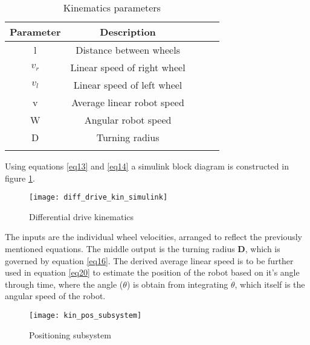 \begin{table}[h]
\centering
\begin{tabular}{cccll}
\hline
Parameter                   & Description                               &  &  \\ \hline
\multicolumn{1}{|c|}{l}     & \multicolumn{1}{c|}{Distance between wheels}       &  &  \\ \cline{1-2}
\multicolumn{1}{|c|}{$v_r$} & \multicolumn{1}{c|}{Linear speed of right wheel}  &  &  \\ \cline{1-2}
\multicolumn{1}{|c|}{$v_l$} & \multicolumn{1}{c|}{Linear speed of left wheel}  &  &  \\ \cline{1-2}
\multicolumn{1}{|c|}{v}     & \multicolumn{1}{c|}{Average linear robot speed}  &  &  \\ \cline{1-2}
\multicolumn{1}{|c|}{W}     & \multicolumn{1}{c|}{Angular robot speed}        &  &  \\ \cline{1-2}
\multicolumn{1}{|c|}{D}     & \multicolumn{1}{c|}{Turning radius}         &  &  \\ \cline{1-2}
\multicolumn{1}{l}{}        & \multicolumn{1}{l}{}                      &  &  \\ \hline
\end{tabular}
\caption{Kinematics parameters}
\label{kin_para}
\end{table}

Using equations \ref{eq13} and \ref{eq14} a simulink block diagram is constructed in figure \ref{fig::diff_simulink}.

\begin{figure}[h]
\centering
\texttt{[image: diff\_drive\_kin\_simulink]}
\caption{Differential drive kinematics}
\label{fig::diff_simulink}
\end{figure} 

The inputs are the individual wheel velocities, arranged to reflect the previously mentioned equations. The middle output is the turning radius \textbf{D}, which is governed by equation \ref{eq16}. The derived average linear speed is to be further used in equation \ref{eq20} to estimate the position of the robot based on it's angle through time, where the angle ($\theta$) is   obtain from integrating $\dot{\theta}$, which itself is the angular speed of the robot. 

\begin{figure}[h]
\centering
\texttt{[image: kin\_pos\_subsystem]}
\caption{Positioning subsystem}
\label{fig::pos_sub}
\end{figure} 

